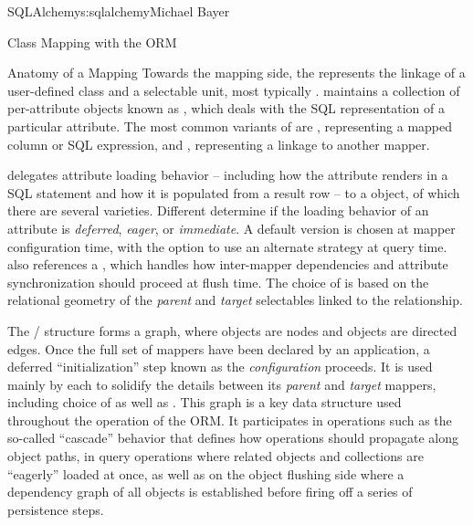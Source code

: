 \begin{aosachapter}{SQLAlchemy}{s:sqlalchemy}{Michael Bayer}
\begin{aosasect1}{Class Mapping with the ORM}
\begin{aosasect2}{Anatomy of a Mapping}
Towards the mapping side, the  represents the linkage of a user-defined class and a selectable unit,
most typically .    maintains a collection
of per-attribute objects known as , which deals with the SQL
representation of a particular attribute.  The most common variants of  are , representing
a mapped column or SQL expression, and , representing a linkage to another mapper.

 delegates attribute loading behavior – including
how the attribute renders in a SQL statement and how it is populated from a result row –
to a  object, of which
there are several varieties.   Different  determine if the loading behavior of
an attribute is \emph{deferred}, \emph{eager}, or \emph{immediate}.  A default version is chosen at mapper
configuration time, with the option to use an alternate strategy at query time.
 also references a ,
which handles how inter-mapper dependencies and attribute synchronization should proceed at flush time.
The choice of  is based on the relational geometry of the \emph{parent} and \emph{target}
selectables linked to the relationship.

The / structure forms a graph, where  objects are nodes and
 objects are directed edges. Once the full set of
mappers have been declared by an application, a deferred ``initialization'' step
known as the \emph{configuration} proceeds. It is used mainly by each
 to solidify the details between its \emph{parent} and
\emph{target} mappers, including choice of  as well as .
This graph is a key data structure used
throughout the operation of the ORM.  It participates in operations such as the
so-called ``cascade'' behavior that defines how operations should propagate
along object paths, in query operations where related objects and collections
are ``eagerly'' loaded at once, as well as on the object flushing side where a
dependency graph of all objects is established before firing off a series of
persistence steps.

\end{aosasect2}

\end{aosasect1}


\end{aosachapter}
